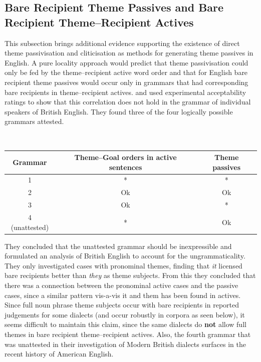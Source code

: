 \subsection{Bare Recipient Theme Passives and Bare Recipient Theme--Recipient Actives}
This subsection brings additional evidence supporting the existence of direct theme passivisation and cliticisation as methods for generating theme passives in English. A pure locality approach would predict that theme passivisation could only be fed by the theme--recipient active word order and that for English bare recipient theme passives would occur only in grammars that had corresponding bare recipients in theme--recipient actives. \cite{Haddican.2010} and \cite{Haddican.2011,Haddican.2012} used experimental acceptability ratings to show that this correlation does not hold in the grammar of individual speakers of British English. They found three of the four logically possible grammars attested. 

\begin{exe}
\ex \cite[Table 2]{Haddican.2012}\\
 \begin{tabular}{|c|c|c|}
 \hline
 Grammar & Theme--Goal orders in active sentences & Theme passives\\
 \hline
 1 & * & * \\
 \hline
 2 & Ok & Ok \\
 \hline
 3 & Ok & * \\
 \hline
 4 (unattested) & * & Ok \\
 \hline
 \end{tabular}
\end{exe}%

They concluded that the unattested grammar should be inexpressible and formulated an analysis of British English to account for the ungrammaticality. They only investigated cases with pronominal themes, finding that \textit{it} licensed bare recipients better than \textit{they} as theme subjects. From this they concluded that there was a connection between the pronominal active cases and the passive cases, since a similar pattern vis-a-vis it and them has been found in actives. Since full noun phrase theme subjects occur with bare recipients in reported judgements for some dialects (and occur robustly in corpora as seen below), it seems difficult to maintain this claim, since the same dialects do \textbf{not} allow full themes in bare recipient theme--recipient actives. Also, the fourth grammar that was unattested in their investigation of Modern British dialects surfaces in the recent history of American English.


